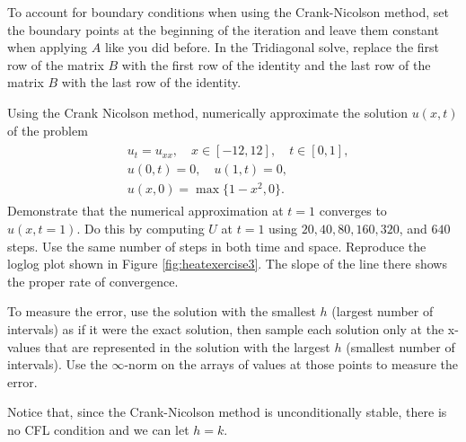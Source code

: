 To account for boundary conditions when using the Crank-Nicolson method, set the boundary points at the beginning of the iteration and leave them constant when applying $A$ like you did before.
In the Tridiagonal solve, replace the first row of the matrix $B$ with the first row of the identity and the last row of the matrix $B$ with the last row of the identity.

\begin{problem}
\label{prob:heat_exercise3}
Using the Crank Nicolson method, numerically approximate the solution $u(x,t)$ of the problem
\begin{align}
	\begin{split}
	&{ } u_t = u_{xx}, \quad x \in [-12,12],\quad t \in [0,1],\\
	&{ } u(0,t) = 0,\quad u(1,t) = 0,\\
	&{ } u(x,0) = \max\{1 - x^2,0\}.
	\end{split}
\end{align}
Demonstrate that the numerical approximation at $t = 1$ converges to  $u(x,t=1)$.
Do this by computing $U$ at $t=1$ using $20,40,80,160,320$, and $640$ steps.
Use the same number of steps in both time and space.
Reproduce the loglog plot shown in Figure \ref{fig:heatexercise3}.
The slope of the line there shows the proper rate of convergence.

To measure the error, use the solution with the smallest $h$ (largest number of intervals) as if it were the exact solution, then sample each solution only at the x-values that are represented in the solution with the largest $h$ (smallest number of intervals).
Use the $\infty$-norm on the arrays of values at those points to measure the error.

Notice that, since the Crank-Nicolson method is unconditionally stable, there is no CFL condition and we can let $h=k$.
\end{problem}

